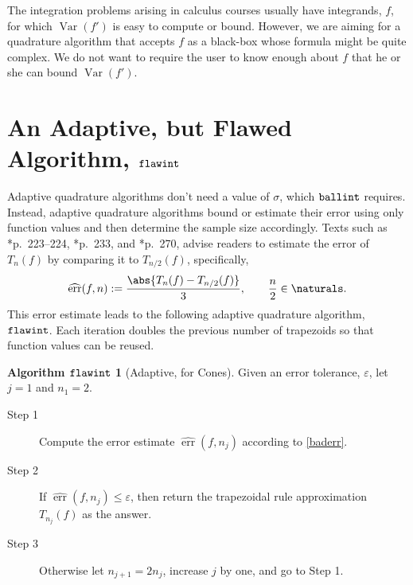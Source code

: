 \documentclass[]{article}
\DeclareMathOperator{\flawinteg}{\texttt{\textup{flawint}}}
\DeclareMathOperator{\ballinteg}{\texttt{\textup{ballint}}}
\DeclareMathOperator{\Var}{Var}
\DeclareMathOperator{\err}{err}
\newcommand{\herr}{\widehat{\err}}
\theoremstyle{definition}
\newtheorem*{flawalgo}{Algorithm $\flawinteg$}
\theoremstyle{remark}
\begin{document}
The integration problems arising in calculus courses usually have integrands, $f$, for which $\Var(f')$ is easy to compute or bound.  However, we are aiming for a quadrature algorithm that accepts $f$ as a black-box whose formula might be quite complex.  We do not want to require the user to know enough about $f$ that he or she can bound $\Var(f')$.


\section{An Adaptive, but Flawed Algorithm, $\flawinteg$} \label{flawstopsec}

Adaptive quadrature algorithms don't need a value of $\sigma$, which $\ballinteg$ requires.  Instead, adaptive quadrature algorithms bound or estimate their error using only function values and then determine the sample size accordingly.  Texts such as *{p.\ 223--224}, *{p.\ 233}, and  *{p.\ 270}, advise readers to estimate the error of $T_n(f)$ by comparing it to $T_{n/2}(f)$, specifically,
\begin{equation}\label{baderr}
\herr(f,n) := \frac{\abs{T_n(f) - T_{n/2}(f)}}{3}, \qquad \frac n2 \in \naturals.
\end{equation}
This error estimate leads to the following adaptive quadrature algorithm, $\flawinteg$. Each iteration doubles the previous number of trapezoids so that function values can be reused. 

\begin{flawalgo}[Adaptive, for Cones] \label{baderralgo} Given an error tolerance, $\varepsilon$, let $j=1$ and $n_1=2$.

\begin{description} 

\item[Step 1] Compute the error estimate $\herr(f,n_j)$ according to \eqref{baderr}.

\item [Step 2] If $\herr(f,n_j) \le \varepsilon$, then return the trapezoidal rule approximation $T_{n_j}(f)$ as the answer.  

\item [Step 3] Otherwise let $n_{j+1}=2 n_j$, increase $j$ by one, and go to Step 1.

\end{description}

\end{flawalgo}
\end{document}
